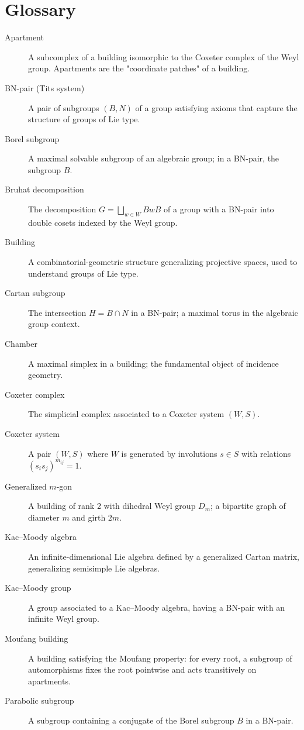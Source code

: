 \section*{Glossary}

\begin{description}
    \item[Apartment] A subcomplex of a building isomorphic to the Coxeter complex of the Weyl group. Apartments are the "coordinate patches" of a building.
    \item[BN-pair (Tits system)] A pair of subgroups \((B, N)\) of a group satisfying axioms that capture the structure of groups of Lie type.
    \item[Borel subgroup] A maximal solvable subgroup of an algebraic group; in a BN-pair, the subgroup \(B\).
    \item[Bruhat decomposition] The decomposition \(G = \bigsqcup_{w \in W} B w B\) of a group with a BN-pair into double cosets indexed by the Weyl group.
    \item[Building] A combinatorial-geometric structure generalizing projective spaces, used to understand groups of Lie type.
    \item[Cartan subgroup] The intersection \(H = B \cap N\) in a BN-pair; a maximal torus in the algebraic group context.
    \item[Chamber] A maximal simplex in a building; the fundamental object of incidence geometry.
    \item[Coxeter complex] The simplicial complex associated to a Coxeter system \((W, S)\).
    \item[Coxeter system] A pair \((W, S)\) where \(W\) is generated by involutions \(s \in S\) with relations \((s_i s_j)^{m_{ij}} = 1\).
    \item[Generalized \(m\)-gon] A building of rank 2 with dihedral Weyl group \(D_m\); a bipartite graph of diameter \(m\) and girth \(2m\).
    \item[Kac--Moody algebra] An infinite-dimensional Lie algebra defined by a generalized Cartan matrix, generalizing semisimple Lie algebras.
    \item[Kac--Moody group] A group associated to a Kac--Moody algebra, having a BN-pair with an infinite Weyl group.
    \item[Moufang building] A building satisfying the Moufang property: for every root, a subgroup of automorphisms fixes the root pointwise and acts transitively on apartments.
    \item[Parabolic subgroup] A subgroup containing a conjugate of the Borel subgroup \(B\) in a BN-pair.

\end{description}
